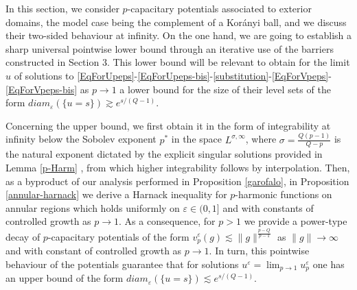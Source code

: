 \documentclass[10pt]{amsart}
\numberwithin{equation}{section}
\theoremstyle{definition}
\begin{document}
In this section, we consider $p$-capacitary potentials associated to  exterior domains, the model case being the complement of a Kor\'{a}nyi ball, and we discuss their two-sided behaviour at infinity. On the one hand, we are going to establish a sharp universal pointwise lower bound through an iterative use of the barriers constructed in Section 3. This lower bound will be relevant to obtain for the limit $u$ of solutions to \eqref{EqForUpeps}-\eqref{EqForUpeps-bis}-\eqref{substitution}-\eqref{EqForVpeps}-\eqref{EqForVpeps-bis} as $p \to 1$ a lower bound for the size of their level sets of the form $diam_\varepsilon (\{ u=s\}) \gtrsim e^{s/(Q-1)}$.  

Concerning the upper bound, we first obtain it in the form of integrability at infinity below the Sobolev exponent $p^*$ in the space $L^{\sigma,\infty}$, where $\sigma=\frac{Q(p-1)}{Q-p}$ is the natural exponent dictated by the explicit singular solutions provided in Lemma \ref{p-Harm} , from which higher integrability follows by interpolation. Then, as a byproduct of our analysis performed in Proposition \ref{garofalo}, in Proposition \ref{annular-harnack} we derive a Harnack inequality for $p$-harmonic functions on annular regions which holds uniformly on $\varepsilon \in (0,1]$ and with constants of controlled growth as $p \to 1$. As a consequence, for $p>1$  we provide a power-type decay of $p$-capacitary potentials of the form 
$ v^\varepsilon_p (g)\lesssim \|g\|^{\frac{p-Q}{p-1}}$ as $\| g\| \to \infty$ and with constant of controlled growth as $p\to 1$. In turn, this pointwise behaviour of the potentials guarantee that for solutions $u^\varepsilon=\lim_{p\to 1} u^\varepsilon_p$ one has an upper bound of the form $diam_\varepsilon (\{ u=s\}) \lesssim e^{s/(Q-1)}$.  
\end{document}
